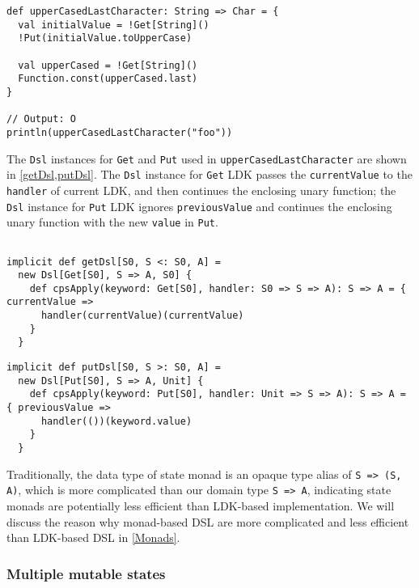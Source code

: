 \begin{lstlisting}[caption={Using \lstinline{Get} and \lstinline{Put} in a unary function},label={upperCasedLastCharacter}]
def upperCasedLastCharacter: String => Char = {
  val initialValue = !Get[String]()
  !Put(initialValue.toUpperCase)

  val upperCased = !Get[String]()
  Function.const(upperCased.last)
}

// Output: O
println(upperCasedLastCharacter("foo"))
\end{lstlisting}

The \lstinline{Dsl} instances for \lstinline{Get} and \lstinline{Put} used in \lstinline{upperCasedLastCharacter} are shown in \cref{getDsl,putDsl}. The \lstinline{Dsl} instance for \lstinline{Get} LDK passes the \lstinline{currentValue} to the \lstinline{handler} of current LDK, and then continues the enclosing unary function; the \lstinline{Dsl} instance for \lstinline{Put} LDK ignores \lstinline{previousValue} and continues the enclosing unary function with the new \lstinline{value} in \lstinline{Put}.

\begin{lstlisting}[caption={The \lstinline{Dsl} instance for \lstinline{Get} LDK},label={getDsl}]

implicit def getDsl[S0, S <: S0, A] =
  new Dsl[Get[S0], S => A, S0] {
    def cpsApply(keyword: Get[S0], handler: S0 => S => A): S => A = { currentValue =>
      handler(currentValue)(currentValue)
    }
  }
\end{lstlisting}

\begin{lstlisting}[caption={The \lstinline{Dsl} instance for \lstinline{Put} LDK},label={putDsl}]
implicit def putDsl[S0, S >: S0, A] =
  new Dsl[Put[S0], S => A, Unit] {
    def cpsApply(keyword: Put[S0], handler: Unit => S => A): S => A = { previousValue =>
      handler(())(keyword.value)
    }
  }
\end{lstlisting}

Traditionally, the data type of state monad is an opaque type alias of \lstinline{S => (S, A)}, which is more complicated than our domain type \lstinline{S => A}, indicating state monads are potentially less efficient than LDK-based implementation. We will discuss the reason why monad-based DSL are more complicated and less efficient than LDK-based DSL in \cref{Monads}.

\subsubsection{Multiple mutable states}\label{Multiple mutable states}

